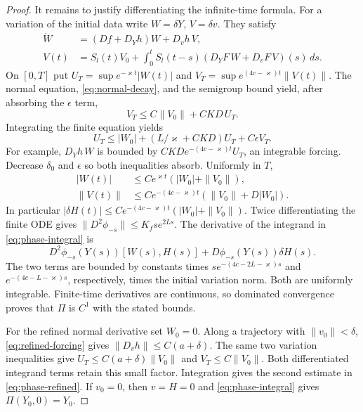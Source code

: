 \documentclass[11pt]{amsart}
\theoremstyle{definition}
\theoremstyle{remark}
\begin{document}
\begin{proof}
It remains to justify differentiating the infinite-time formula.
For a variation of the initial data write $W=\delta Y$, $V=\delta v$.
They satisfy
\begin{equation}\label{eq:phase-variations}
 \begin{aligned}
 \dot W&=(Df+D_Yh)W+D_vh\,V,\\
 V(t)&=S_l(t)V_0+\int_0^tS_l(t-s)
                  (D_YF\,W+D_vF\,V)(s)\,ds .
 \end{aligned}
\end{equation}
On $[0,T]$ put
$U_T=\sup e^{-\varkappa t}|W(t)|$ and
$V_T=\sup e^{(4c-\varkappa)t}\|V(t)\|$.
The normal equation, \eqref{eq:normal-decay}, and the semigroup
bound yield, after absorbing the $\epsilon$ term,
\[
 V_T\le C\|V_0\|+CKD\,U_T.
\]
Integrating the finite equation yields
\[
 U_T\le |W_0|+
       (L/\varkappa+CKD)U_T+C\epsilon V_T.
\]
For example, $D_Yh\,W$ is bounded by
$CKD e^{-(4c-\varkappa)t}U_T$, an integrable forcing.
Decrease $\delta_0$ and $\epsilon$ so both inequalities absorb.
Uniformly in $T$,
\begin{equation}\label{eq:variation-bounds}
 \begin{aligned}
 |W(t)|&\le Ce^{\varkappa t}(|W_0|+\|V_0\|),\\
 \|V(t)\|&\le Ce^{-(4c-\varkappa)t}(\|V_0\|+D|W_0|).
 \end{aligned}
\end{equation}
In particular
$|\delta H(t)|\le Ce^{-(4c-\varkappa)t}(|W_0|+\|V_0\|)$.
Twice differentiating the finite ODE gives
$\|D^2\phi_{-s}\|\le K_fs e^{2Ls}$. The derivative of the
integrand in \eqref{eq:phase-integral} is
\[
 D^2\phi_{-s}(Y(s))[W(s),H(s)]
       +D\phi_{-s}(Y(s))\delta H(s).
\]
The two terms are bounded by constants times
$s e^{-(4c-2L-\varkappa)s}$ and
$e^{-(4c-L-\varkappa)s}$, respectively, times the initial
variation norm. Both are uniformly integrable. Finite-time
derivatives are continuous, so dominated convergence proves that
$\Pi$ is $C^1$ with the stated bounds.

For the refined normal derivative set $W_0=0$. Along a trajectory
with $\|v_0\|<\delta$, \eqref{eq:refined-forcing} gives
$\|D_vh\|\le C(a+\delta)$. The same two variation inequalities
give $U_T\le C(a+\delta)\|V_0\|$ and $V_T\le C\|V_0\|$.
Both differentiated integrand terms retain this small factor.
Integration gives the second estimate in \eqref{eq:phase-refined}.
If $v_0=0$, then $v=H=0$ and \eqref{eq:phase-integral} gives
$\Pi(Y_0,0)=Y_0$.
\end{proof}
\end{document}
